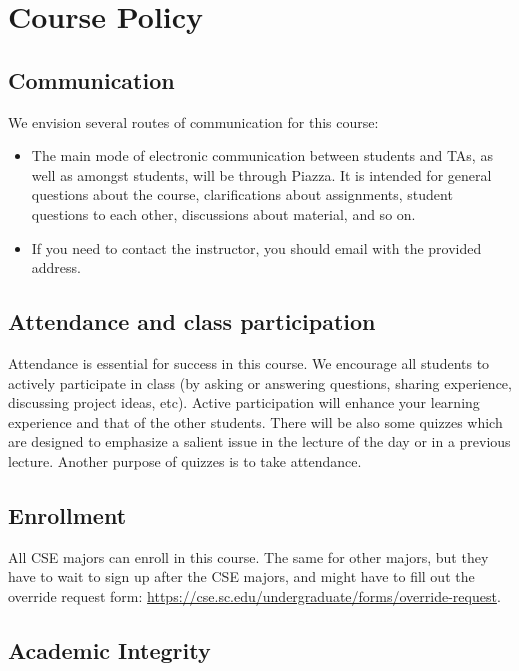\documentclass[11pt]{article}
\begin{document}
\section*{Course Policy}

\subsection*{Communication}
We envision several routes of communication for this course:

\begin{itemize}
\item The main mode of electronic communication between students and TAs, as well as amongst students, will be through Piazza. It is intended for general questions about the course, clarifications about assignments, student questions to each other, discussions about material, and so on. 

\item If you need to contact the instructor, you should email with the provided address. 
\end{itemize}

\subsection*{Attendance and class participation}
Attendance is essential for success in this course. We encourage all students to actively participate in class (by asking or answering questions, sharing experience, discussing project ideas, etc). Active participation will enhance your learning experience and that of the other students. There will be also some quizzes which are designed to emphasize a salient issue in the lecture of the day or in a previous lecture. Another purpose of quizzes is to take attendance. 

\subsection*{Enrollment}

All CSE majors can enroll in this course. The same for other majors, but they have to wait to sign up after the CSE majors, and might have to fill out the override request form: \url{https://cse.sc.edu/undergraduate/forms/override-request}.

\subsection*{Academic Integrity}
\end{document}
